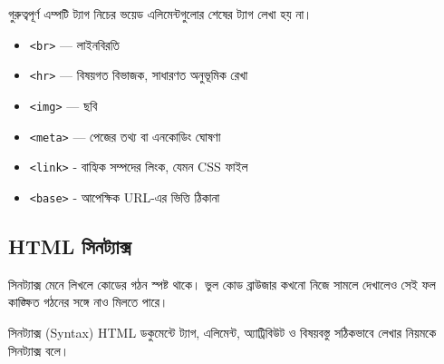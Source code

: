 \begin{keypointbox}{গুরুত্বপূর্ণ এম্পটি ট্যাগ}
নিচের ভয়েড এলিমেন্টগুলোর শেষের ট্যাগ লেখা হয় না।
\par\noindent
\begin{minipage}[t]{.48\linewidth}\vspace{0pt}
\begin{itemize}
\item \texttt{<br>} — লাইনবিরতি
\item \texttt{<hr>} — বিষয়গত বিভাজক, সাধারণত অনুভূমিক রেখা
\item \texttt{<img>} — ছবি
\end{itemize}
\end{minipage}\hfill
\begin{minipage}[t]{.48\linewidth}\vspace{0pt}
\begin{itemize}
\item \texttt{<meta>} — পেজের তথ্য বা এনকোডিং ঘোষণা
\item \texttt{<link>} - বাহ্যিক সম্পদের লিংক, যেমন CSS ফাইল
\item \texttt{<base>} - আপেক্ষিক URL-এর ভিত্তি ঠিকানা
\end{itemize}
\end{minipage}\par

\end{keypointbox}

\subsection{HTML সিনট্যাক্স}
সিনট্যাক্স মেনে লিখলে কোডের গঠন স্পষ্ট থাকে। ভুল কোড ব্রাউজার কখনো নিজে সামলে দেখালেও সেই ফল কাঙ্ক্ষিত গঠনের সঙ্গে নাও মিলতে পারে।

\begin{definitionbox}{সিনট্যাক্স (Syntax)}
HTML ডকুমেন্টে ট্যাগ, এলিমেন্ট, অ্যাট্রিবিউট ও বিষয়বস্তু সঠিকভাবে লেখার নিয়মকে সিনট্যাক্স বলে।
\end{definitionbox}

\begin{center}
\end{center}

